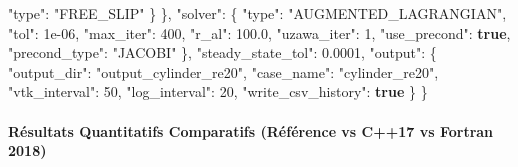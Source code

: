 \documentclass[
  10pt,
]{article}
\newenvironment{Shaded}{}{}
\newcommand{\DataTypeTok}[1]{\textcolor[rgb]{0.56,0.13,0.00}{#1}}
\newcommand{\DecValTok}[1]{\textcolor[rgb]{0.25,0.63,0.44}{#1}}
\newcommand{\FloatTok}[1]{\textcolor[rgb]{0.25,0.63,0.44}{#1}}
\newcommand{\FunctionTok}[1]{\textcolor[rgb]{0.02,0.16,0.49}{#1}}
\newcommand{\KeywordTok}[1]{\textcolor[rgb]{0.00,0.44,0.13}{\textbf{#1}}}
\newcommand{\StringTok}[1]{\textcolor[rgb]{0.25,0.44,0.63}{#1}}
\begin{document}
\begin{Shaded}
\begin{Highlighting}[]
      \DataTypeTok{"type"}\FunctionTok{:} \StringTok{"FREE\_SLIP"}
    \FunctionTok{\}}
  \FunctionTok{\},}
  \DataTypeTok{"solver"}\FunctionTok{:} \FunctionTok{\{}
    \DataTypeTok{"type"}\FunctionTok{:} \StringTok{"AUGMENTED\_LAGRANGIAN"}\FunctionTok{,}
    \DataTypeTok{"tol"}\FunctionTok{:} \DecValTok{1e{-}06}\FunctionTok{,}
    \DataTypeTok{"max\_iter"}\FunctionTok{:} \DecValTok{400}\FunctionTok{,}
    \DataTypeTok{"r\_al"}\FunctionTok{:} \FloatTok{100.0}\FunctionTok{,}
    \DataTypeTok{"uzawa\_iter"}\FunctionTok{:} \DecValTok{1}\FunctionTok{,}
    \DataTypeTok{"use\_precond"}\FunctionTok{:} \KeywordTok{true}\FunctionTok{,}
    \DataTypeTok{"precond\_type"}\FunctionTok{:} \StringTok{"JACOBI"}
  \FunctionTok{\},}
  \DataTypeTok{"steady\_state\_tol"}\FunctionTok{:} \FloatTok{0.0001}\FunctionTok{,}
  \DataTypeTok{"output"}\FunctionTok{:} \FunctionTok{\{}
    \DataTypeTok{"output\_dir"}\FunctionTok{:} \StringTok{"output\_cylinder\_re20"}\FunctionTok{,}
    \DataTypeTok{"case\_name"}\FunctionTok{:} \StringTok{"cylinder\_re20"}\FunctionTok{,}
    \DataTypeTok{"vtk\_interval"}\FunctionTok{:} \DecValTok{50}\FunctionTok{,}
    \DataTypeTok{"log\_interval"}\FunctionTok{:} \DecValTok{20}\FunctionTok{,}
    \DataTypeTok{"write\_csv\_history"}\FunctionTok{:} \KeywordTok{true}
  \FunctionTok{\}}
\FunctionTok{\}}
\end{Highlighting}
\end{Shaded}

\paragraph{Résultats Quantitatifs Comparatifs (Référence vs C++17 vs
Fortran
2018)}\label{ruxe9sultats-quantitatifs-comparatifs-ruxe9fuxe9rence-vs-c17-vs-fortran-2018-6}
\end{document}
